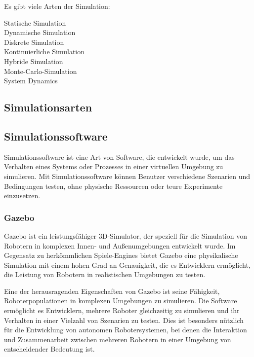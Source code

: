 Es gibt viele Arten der Simulation: 
\begin{description}
    \item[Statische Simulation] 
    \item[Dynamische Simulation] 
    \item[Diskrete Simulation] 
    \item[Kontinuierliche Simulation] 
    \item[Hybride Simulation] 
    \item[Monte-Carlo-Simulation] 
    \item[System Dynamics] 
\end{description}

\subsection{Simulationsarten}

\subsection{Simulationssoftware}
Simulationssoftware ist eine Art von Software, die entwickelt wurde, um das Verhalten eines Systems oder Prozesses in einer virtuellen Umgebung zu simulieren. Mit Simulationssoftware können Benutzer verschiedene Szenarien und Bedingungen testen, ohne physische Ressourcen oder teure Experimente einzusetzen.

\subsubsection{Gazebo}
Gazebo ist ein leistungsfähiger 3D-Simulator, der speziell für die Simulation von Robotern in komplexen Innen- und Außenumgebungen entwickelt wurde. Im Gegensatz zu herkömmlichen Spiele-Engines bietet Gazebo eine physikalische Simulation mit einem hohen Grad an Genauigkeit, die es Entwicklern ermöglicht, die Leistung von Robotern in realistischen Umgebungen zu testen.

Eine der herausragenden Eigenschaften von Gazebo ist seine Fähigkeit, Roboterpopulationen in komplexen Umgebungen zu simulieren. Die Software ermöglicht es Entwicklern, mehrere Roboter gleichzeitig zu simulieren und ihr Verhalten in einer Vielzahl von Szenarien zu testen. Dies ist besonders nützlich für die Entwicklung von autonomen Robotersystemen, bei denen die Interaktion und Zusammenarbeit zwischen mehreren Robotern in einer Umgebung von entscheidender Bedeutung ist.

